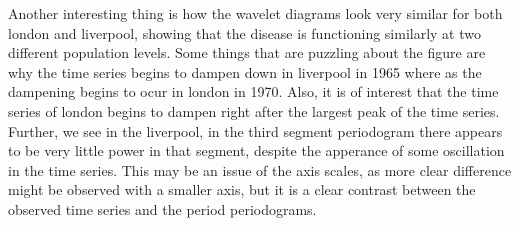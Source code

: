Another interesting thing is how the wavelet diagrams look very similar for both london and liverpool, showing that the disease is functioning similarly at two different population levels. Some things that are puzzling about the figure are why the time series begins to dampen down in liverpool in 1965 where as the dampening begins to ocur in london in 1970. Also, it is of interest that  the time series of london begins to dampen right after the largest peak of the time series. Further, we see in the liverpool, in the third segment periodogram there appears to be very little power in that segment, despite the apperance of some oscillation in the time series. This may be an issue of the axis scales, as more clear difference might be observed with a smaller axis, but it is a clear contrast between the observed time series and the period periodograms.
